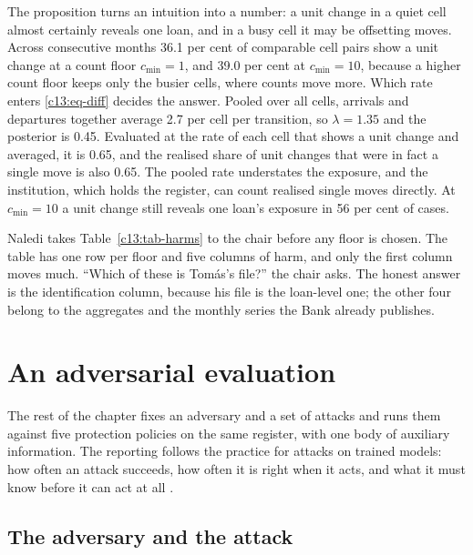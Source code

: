 The proposition turns an intuition into a number: a unit change in a quiet cell
almost certainly reveals one loan, and in a busy cell it may be offsetting moves.
Across consecutive months 36.1 per cent of comparable cell pairs show a unit change
at a count floor $c_{\min}=1$, and 39.0 per cent at $c_{\min}=10$, because a higher
count floor keeps only the busier cells, where counts move more.
Which rate enters \eqref{c13:eq-diff} decides the answer. Pooled over all cells,
arrivals and departures together average 2.7 per cell per transition, so
$\lambda = 1.35$ and the posterior is 0.45. Evaluated at the rate of each cell that
shows a unit change and averaged, it is 0.65, and the realised share of unit changes
that were in fact a single move is also 0.65.
The pooled rate understates the exposure, and the institution, which holds the
register, can count realised single moves directly. At $c_{\min}=10$ a unit change
still reveals one loan's exposure in 56 per cent of cases.

Naledi takes Table~\ref{c13:tab-harms} to the chair before any floor is chosen. The
table has one row per floor and five columns of harm, and only the first column
moves much. ``Which of these is Tomás's file?'' the chair asks. The honest answer is
the identification column, because his file is the loan-level one; the other four
belong to the aggregates and the monthly series the Bank already publishes.

\section{An adversarial evaluation}\label{c13:sec-eval}

The rest of the chapter fixes an adversary and a set of attacks and runs them
against five protection policies on the same register, with one body of auxiliary
information. The reporting follows the practice for attacks on trained models: how
often an attack succeeds, how often it is right when it acts, and what it must know
before it can act at all \citep{shokri2017,carlini2022}.

\subsection{The adversary and the attack}

